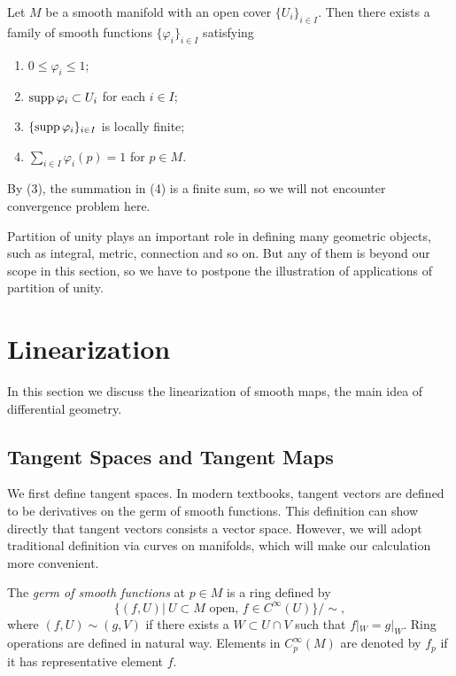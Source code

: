 \begin{thm}
    Let $M$ be a smooth manifold with an open cover $\{U_i\}_{i\in I}$.
    Then there exists a family of smooth functions $\{\varphi_i\}_{i\in I}$ satisfying
    \begin{enumerate}[(1)]
        \item $0\leq\varphi_i\leq 1$;
        \item $\operatorname{supp}\varphi_i\subset U_i$ for each $i\in I$;
        \item $\{\operatorname{supp}\varphi_i\}_{i\in I}$ is locally finite;
        \item $\sum_{i\in I}\varphi_i(p)=1$ for $p\in M$.
    \end{enumerate}
\end{thm}

\begin{rem}
    By (3), the summation in (4) is a finite sum, so we will not encounter convergence problem here.
\end{rem}

Partition of unity plays an important role in defining many geometric objects, such as integral, metric, connection and so on.
But any of them is beyond our scope in this section, so we have to postpone the illustration of applications of partition of unity.

\section{Linearization}\label{section linearization}
In this section we discuss the linearization of smooth maps, the main idea of differential geometry.

\subsection*{Tangent Spaces and Tangent Maps}

We first define tangent spaces.
In modern textbooks, tangent vectors are defined to be derivatives on the germ of smooth functions.
This definition can show directly that tangent vectors consists a vector space.
However, we will adopt traditional definition via curves on manifolds, which will make our calculation more convenient.

\begin{defn}
    The \emph{germ of smooth functions} at $p\in M$ is a ring defined by
    \[\{(f,U)|\ U\subset M\text{ open, }f\in C^\infty(U)\}/\sim,\]
    where $(f,U)\sim(g,V)$ if there exists a $W\subset U\cap V$ such that $f|_W=g|_W$.
    Ring operations are defined in natural way.
    Elements in $C^\infty_p(M)$ are denoted by $f_p$ if it has representative element $f$.
\end{defn}

